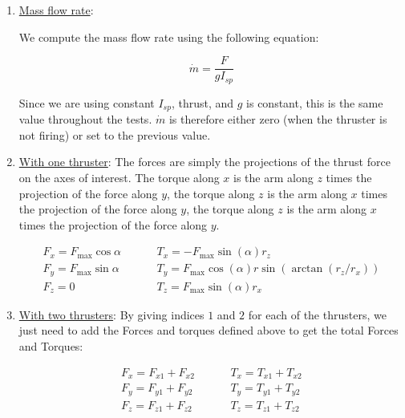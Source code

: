 \begin{enumerate}
	
	\item{\underline{Mass flow rate}}: 
	
	We compute the mass flow rate using the following equation:
	
	\begin{equation}
	\dot{m} = \frac{F}{g I_{sp}}
	\end{equation}
	
	Since we are using constant $I_{sp}$, thrust, and $g$ is constant, this is the same value throughout the tests. $\dot{m}$ is therefore either zero (when the thruster is not firing) or set to the previous value. 
	
	\item{\underline{With one thruster}}: The forces are simply the projections of the thrust force on the axes of interest. The torque along $x$ is the arm along $z$ times the projection of the force along $y$, the torque along $z$ is the arm along $x$ times the projection of the force along $y$, the torque along $z$ is the arm along $x$ times the projection of the force along $y$. 
	
	\begin{align}
		F_x =F_{\mathrm{max}} \cos \alpha &\hspace{1cm} T_x = - F_{\mathrm{max}}\sin(\alpha) r_z \\ 
		F_y = F_{\mathrm{max}} \sin \alpha &\hspace{1cm} T_y = F_{\mathrm{max}} \cos(\alpha) r \sin( \arctan(r_z/r_x)) \\ 
		F_z = 0 &\hspace{1cm} T_z =  F_{\mathrm{max}} \sin(\alpha) r_x 
	\end{align}
	
	
	\item{\underline{With two thrusters}}: By giving indices $1$ and $2$ for each of the thrusters, we just need to add the Forces and torques defined above to get the total Forces and Torques:
	
	\begin{align}
		F_x = F_{x1} + F_{x2} &\hspace{1cm} T_x = T_{x1} + T_{x2} \\ 
		F_y =  F_{y1} + F_{y2} &\hspace{1cm} T_y =  T_{y1} + T_{y2}\\ 
		F_z =  F_{z1} + F_{z2} &\hspace{1cm} T_z =  T_{z1} + T_{z2}
	\end{align}
	

\end{enumerate}
